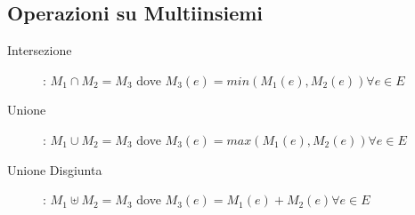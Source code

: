 \subsection{Operazioni su Multiinsiemi}
\begin{description}
    \item[Intersezione]: $M_1 \cap M_2 = M_3$ dove $M_3(e) = min(M_1(e),M_2(e)) \forall e \in E$
    \item[Unione]: $M_1 \cup M_2 = M_3$ dove $M_3(e) = max(M_1(e),M_2(e)) \forall e \in E$
    \item[Unione Disgiunta]: $M_1 \uplus M_2 = M_3$ dove $M_3(e) = M_1(e) + M_2(e) \forall e \in E$
\end{description}

